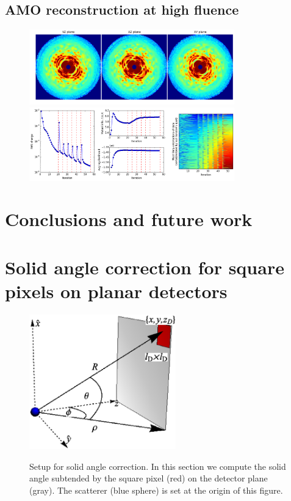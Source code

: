 \documentclass[]{iucr}              %
\begin{document}
\subsection{AMO reconstruction at high fluence}
\label{subsec:amohigh}

\begin{figure}
\caption{}
\includegraphics[width=3.5in]{figures/cxi_intens_055.png} \label{fig:cxi_intens}
\includegraphics[width=3.5in]{figures/cxi_log_fig.png} \label{fig:cxi_log_fig}
\end{figure}


\section{Conclusions and future work}


\appendix

\section{Solid angle correction for square pixels on planar detectors}
\begin{figure}
\caption{Setup for solid angle correction. In this section we compute the solid angle subtended by the square pixel (red) on the detector plane (gray). The scatterer (blue sphere) is set at the origin of this figure.}
\includegraphics[width=2.5in]{figures/solidAngle.eps} \label{fig:solidAngle}
\end{figure}
\end{document}
